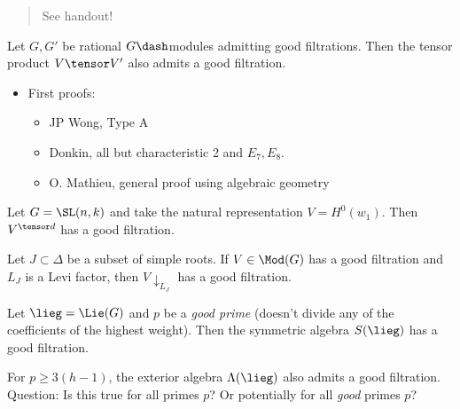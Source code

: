 \begin{quote}
See handout!
\end{quote}

\begin{theorem}[?]

Let \(G ,G'\) be rational \(G\dash\)modules admitting good filtrations.
Then the tensor product \(V\tensor V'\) also admits a good filtration.

\end{theorem}

\begin{itemize}
\tightlist
\item
  First proofs:

  \begin{itemize}
  \tightlist
  \item
    JP Wong, Type A
  \item
    Donkin, all but characteristic 2 and \(E_7, E_8\).
  \item
    O. Mathieu, general proof using algebraic geometry
  \end{itemize}
\end{itemize}

\begin{example}

Let \(G = \SL(n, k)\) and take the natural representation
\(V = H^0(w_1)\). Then \(V^{\tensor d}\) has a good filtration.

\end{example}

\begin{theorem}[?]

Let \(J\subset \Delta\) be a subset of simple roots. If
\(V \in \Mod(G)\) has a good filtration and \(L_J\) is a Levi factor,
then \(V{\downarrow_{L_J}}\) has a good filtration.

\end{theorem}

\begin{theorem}[?]

Let \(\lieg = \Lie(G)\) and \(p\) be a \emph{good prime} (doesn't divide
any of the coefficients of the highest weight). Then the symmetric
algebra \(S(\lieg)\) has a good filtration.

\end{theorem}

\begin{remark}

For \(p\geq 3(h-1)\), the exterior algebra \(\Lambda(\lieg)\) also
admits a good filtration. Question: Is this true for all primes \(p\)?
Or potentially for all \emph{good} primes \(p\)?

\end{remark}

